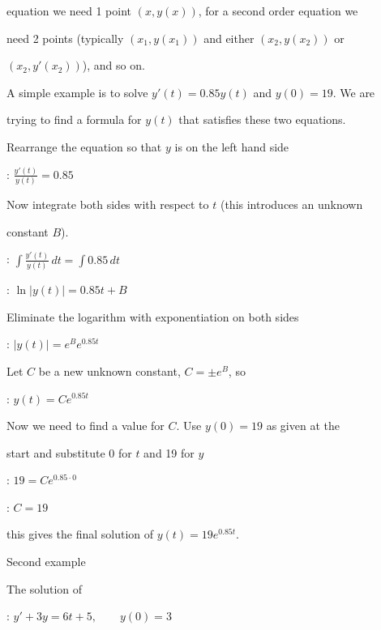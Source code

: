 equation we need 1 point $(x, y(x))$, for a second order equation we

need 2 points (typically $(x_1, y(x_1))$ and either $(x_2, y(x_2))$ or

$(x_2, y'(x_2))$), and so on.



A simple example is to solve $y'(t) = 0.85 y(t)$ and $y(0) = 19$. We are

trying to find a formula for $y(t)$ that satisfies these two equations.



Rearrange the equation so that $y$ is on the left hand side



:   $\frac{y'(t)}{y(t)} = 0.85$



Now integrate both sides with respect to $t$ (this introduces an unknown

constant $B$).



:   $\int \frac{y'(t)}{y(t)}\,dt = \int 0.85\,dt$

:   $\ln |y(t)| = 0.85t + B$



Eliminate the logarithm with exponentiation on both sides



:   $| y(t) | = e^Be^{0.85t}$



Let $C$ be a new unknown constant, $C = \pm e^B$, so



:   $y(t) = Ce^{0.85t}$



Now we need to find a value for $C$. Use $y(0) = 19$ as given at the

start and substitute 0 for $t$ and 19 for $y$



:   $19 = C e^{0.85 \cdot 0}$

:   $C = 19$



this gives the final solution of $y(t) = 19e^{0.85t}$.



Second example



The solution of



:   $y'+3y=6t+5,\qquad y(0)=3$



